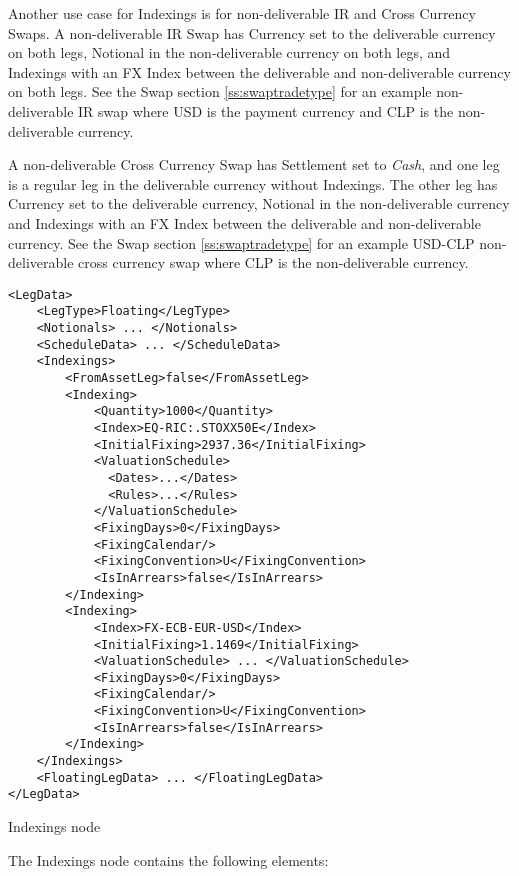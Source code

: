 Another use case for Indexings is for non-deliverable IR and Cross Currency Swaps. A non-deliverable IR Swap has Currency set to the deliverable currency on both legs, Notional in the non-deliverable currency on both legs, and Indexings with an FX Index between the deliverable and non-deliverable currency on both legs. See the Swap section \ref{ss:swaptradetype} for an example non-deliverable IR swap where USD is the payment currency and CLP is the non-deliverable currency.

A non-deliverable Cross Currency Swap has Settlement set to \emph{Cash}, and one leg is a regular leg in the deliverable currency without Indexings. The other leg has Currency set to the deliverable currency, Notional in the non-deliverable currency and Indexings with an FX Index between the deliverable and non-deliverable currency. See the Swap section \ref{ss:swaptradetype} for an example USD-CLP non-deliverable cross currency swap where CLP is the non-deliverable currency.

\begin{listing}[H]
\begin{verbatim}
<LegData>
    <LegType>Floating</LegType>
    <Notionals> ... </Notionals>
    <ScheduleData> ... </ScheduleData>
    <Indexings>
        <FromAssetLeg>false</FromAssetLeg>
        <Indexing>
            <Quantity>1000</Quantity>
            <Index>EQ-RIC:.STOXX50E</Index>
            <InitialFixing>2937.36</InitialFixing>
            <ValuationSchedule>
              <Dates>...</Dates>
              <Rules>...</Rules>
            </ValuationSchedule>
            <FixingDays>0</FixingDays>
            <FixingCalendar/>
            <FixingConvention>U</FixingConvention>
            <IsInArrears>false</IsInArrears>
        </Indexing>
        <Indexing>
            <Index>FX-ECB-EUR-USD</Index>
            <InitialFixing>1.1469</InitialFixing>
            <ValuationSchedule> ... </ValuationSchedule>
            <FixingDays>0</FixingDays>
            <FixingCalendar/>
            <FixingConvention>U</FixingConvention>
            <IsInArrears>false</IsInArrears>
        </Indexing>
    </Indexings>
    <FloatingLegData> ... </FloatingLegData>
</LegData>
\end{verbatim}
\caption{Indexings node}
\label{lst:indexings}
\end{listing}

The Indexings node contains the following elements:

